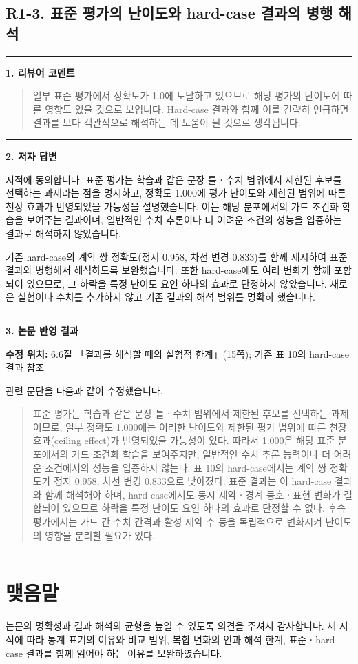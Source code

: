 \documentclass[11pt]{article}
\newcommand{\fieldheading}[2]{%
  \par\medskip\noindent
  {\color{#1}\rule{3pt}{1.25em}}\hspace{0.55em}\textbf{#2}\par\smallskip}
\newenvironment{reviewitem}[1]
  {\subsection*{#1}}
  {\par\medskip\hrule\bigskip}
\newenvironment{reviewercomment}
  {\fieldheading{reviewercolor}{1. 리뷰어 코멘트}%
   \begin{quote}}
  {\end{quote}}
\newenvironment{authorresponse}
  {\fieldheading{responsecolor}{2. 저자 답변}}
  {\par}
\newenvironment{manuscriptrevision}[1]
  {\fieldheading{revisioncolor}{3. 논문 반영 결과}%
   \textbf{수정 위치:} #1\par\smallskip}
  {\par}
\begin{document}
\clearpage
\begin{reviewitem}{R1-3. 표준 평가의 난이도와 hard-case 결과의 병행 해석}
\begin{reviewercomment}
일부 표준 평가에서 정확도가 1.0에 도달하고 있으므로 해당 평가의 난이도에 따른 영향도 있을 것으로 보입니다. Hard-case 결과와 함께 이를 간략히 언급하면 결과를 보다 객관적으로 해석하는 데 도움이 될 것으로 생각됩니다.
\end{reviewercomment}
\begin{authorresponse}
지적에 동의합니다. 표준 평가는 학습과 같은 문장 틀ㆍ수치 범위에서 제한된
후보를 선택하는 과제라는 점을 명시하고, 정확도 1.000에 평가 난이도와
제한된 범위에 따른 천장 효과가 반영되었을 가능성을 설명했습니다.
이는 해당 분포에서의 가드 조건화 학습을 보여주는 결과이며, 일반적인 수치
추론이나 더 어려운 조건의 성능을 입증하는 결과로 해석하지 않았습니다.

기존 hard-case의 계약 쌍 정확도(정지 0.958, 차선 변경 0.833)를 함께 제시하여
표준 결과와 병행해서 해석하도록 보완했습니다. 또한 hard-case에도 여러 변화가
함께 포함되어 있으므로, 그 하락을 특정 난이도 요인 하나의 효과로 단정하지
않았습니다. 새로운 실험이나 수치를 추가하지 않고 기존 결과의 해석 범위를
명확히 했습니다.
\end{authorresponse}
\begin{manuscriptrevision}{6.6절 「결과를 해석할 때의 실험적 한계」(15쪽); 기존 표 10의 hard-case 결과 참조}
관련 문단을 다음과 같이 수정했습니다.
\begin{quote}
표준 평가는 학습과 같은 문장 틀ㆍ수치 범위에서 제한된 후보를 선택하는 과제이므로, 일부 정확도 1.000에는 이러한 난이도와 제한된 평가 범위에 따른 천장 효과(ceiling effect)가 반영되었을 가능성이 있다. 따라서 1.000은 해당 표준 분포에서의 가드 조건화 학습을 보여주지만, 일반적인 수치 추론 능력이나 더 어려운 조건에서의 성능을 입증하지 않는다. 표 10의 hard-case에서는 계약 쌍 정확도가 정지 0.958, 차선 변경 0.833으로 낮아졌다. 표준 결과는 이 hard-case 결과와 함께 해석해야 하며, hard-case에서도 동시 제약ㆍ경계 등호ㆍ표현 변화가 결합되어 있으므로 하락을 특정 난이도 요인 하나의 효과로 단정할 수 없다. 후속 평가에서는 가드 간 수치 간격과 활성 제약 수 등을 독립적으로 변화시켜 난이도의 영향을 분리할 필요가 있다.
\end{quote}
\end{manuscriptrevision}
\end{reviewitem}

\section*{맺음말}
논문의 명확성과 결과 해석의 균형을 높일 수 있도록 의견을 주셔서 감사합니다.
세 지적에 따라 통계 표기의 이유와 비교 범위, 복합 변화의 인과 해석 한계,
표준ㆍhard-case 결과를 함께 읽어야 하는 이유를 보완하였습니다.
\end{document}
